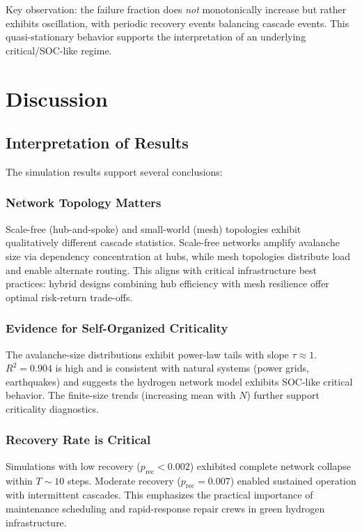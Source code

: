 \documentclass[12pt,a4paper,twoside]{report}
\begin{document}
Key observation: the failure fraction does \textit{not} monotonically increase but rather exhibits oscillation, with periodic recovery events balancing cascade events. This quasi-stationary behavior supports the interpretation of an underlying critical/SOC-like regime.

\chapter{Discussion}

\section{Interpretation of Results}

The simulation results support several conclusions:

\subsection{Network Topology Matters}
Scale-free (hub-and-spoke) and small-world (mesh) topologies exhibit qualitatively different cascade statistics. Scale-free networks amplify avalanche size via dependency concentration at hubs, while mesh topologies distribute load and enable alternate routing. This aligns with critical infrastructure best practices: hybrid designs combining hub efficiency with mesh resilience offer optimal risk-return trade-offs.

\subsection{Evidence for Self-Organized Criticality}
The avalanche-size distributions exhibit power-law tails with slope $\tau \approx 1$. $R^2 = 0.904$ is high and is consistent with natural systems (power grids, earthquakes) and suggests the hydrogen network model exhibits SOC-like critical behavior. The finite-size trends (increasing mean with $N$) further support criticality diagnostics.

\subsection{Recovery Rate is Critical}
Simulations with low recovery ($p_{\text{rec}} < 0.002$) exhibited complete network collapse within $T \sim 10$ steps. Moderate recovery ($p_{\text{rec}} = 0.007$) enabled sustained operation with intermittent cascades. This emphasizes the practical importance of maintenance scheduling and rapid-response repair crews in green hydrogen infrastructure.
\end{document}
